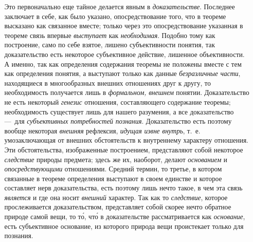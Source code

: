 \documentclass[twoside]{article}
\begin{document}
Это первоначально еще тайное делается явным в
{\em доказательстве}.
Последнее заключает в себе, как было указано,
опосредствование того, что в теореме высказано как связанное вместе; только
через это опосредствование указанная в теореме связь впервые
{\em выступает} как
{\em необходимая}.
Подобно тому как построение, само по себе взятое, лишено
субъективности понятия, так доказательство есть некоторое субъективное
действие, лишенное объективности. А именно, так как определения содержания
теоремы не положены вместе с тем как определения понятия, а выступают
только как данные {\em безразличные
части}, находящиеся в многообразных внешних отношениях друг
к другу, то необходимость получается лишь в
{\em формальном, внешнем}
понятии. Доказательство не есть некоторый
{\em генезис} отношения,
составляющего содержание теоремы; необходимость существует лишь для нашего
разумения, а все доказательство —~для
{\em субъективных потребностей
познания}. Доказательство есть поэтому вообще некоторая
{\em внешняя} рефлексия,
{\em идущая извне внутрь},
т.~е. умозаключающая от внешних обстоятельств к внутреннему
характеру отношения. Эти обстоятельства, изображенные построением,
представляют собой некоторое
{\em следствие} природы
предмета; здесь же их, наоборот, делают
{\em основанием} и
{\em опосредствующими}
отношениями. Средний термин, то третье, в котором связанные в
теореме определения выступают в своем единстве и которое составляет нерв
доказательства, есть поэтому лишь нечто такое, в чем эта связь
{\em является} и где она
носит {\em внешний}
характер. Так как то
{\em следствие}, которое
прослеживается доказательством, представляет собой скорее нечто обратное
природе самой вещи, то то́, что́ в доказательстве рассматривается как
{\em основание}, есть
субъективное основание, из которого природа вещи проистекает только для
познания.
\end{document}
